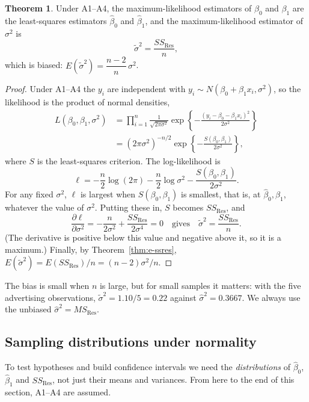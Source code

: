 \documentclass[11pt,a4paper]{article}
\numberwithin{equation}{section}
\theoremstyle{definition}
\newtheorem{thm}{Theorem}[subsection]
\begin{document}
\begin{thm}\label{thm:mle}
Under A1--A4, the maximum-likelihood estimators of $\beta_0$ and $\beta_1$ are the
least-squares estimators $\hat\beta_0$ and $\hat\beta_1$, and the maximum-likelihood
estimator of $\sigma^2$ is
\[
\tilde\sigma^2 = \frac{SS_{\mathrm{Res}}}{n} ,
\]
which is biased: $E(\tilde\sigma^2) = \dfrac{n-2}{n}\,\sigma^2$.
\end{thm}

\begin{proof}
Under A1--A4 the $y_i$ are independent with $y_i \sim N(\beta_0 + \beta_1 x_i, \sigma^2)$, so
the likelihood is the product of normal densities,
\begin{align*}
L(\beta_0, \beta_1, \sigma^2)
&= \prod_{i=1}^n \frac{1}{\sqrt{2\pi\sigma^2}} \exp\left\{ -\frac{(y_i - \beta_0 - \beta_1 x_i)^2}{2\sigma^2} \right\} \\
&= (2\pi\sigma^2)^{-n/2} \exp\left\{ -\frac{S(\beta_0, \beta_1)}{2\sigma^2} \right\},
\end{align*}
where $S$ is the least-squares criterion. The log-likelihood is
\[
\ell = -\frac n2 \log(2\pi) - \frac n2 \log \sigma^2 - \frac{S(\beta_0, \beta_1)}{2\sigma^2} .
\]
For any fixed $\sigma^2$, $\ell$ is largest when $S(\beta_0, \beta_1)$ is smallest, that is,
at $\hat\beta_0, \hat\beta_1$, whatever the value of $\sigma^2$. Putting these in, $S$ becomes
$SS_{\mathrm{Res}}$, and
\[
\frac{\partial \ell}{\partial \sigma^2} = -\frac{n}{2\sigma^2} + \frac{SS_{\mathrm{Res}}}{2\sigma^4} = 0
\quad\text{gives}\quad \tilde\sigma^2 = \frac{SS_{\mathrm{Res}}}{n} .
\]
(The derivative is positive below this value and negative above it, so it is a maximum.)
Finally, by Theorem~\ref{thm:e-ssres},
$E(\tilde\sigma^2) = E(SS_{\mathrm{Res}})/n = (n-2)\sigma^2/n$.
\end{proof}

The bias is small when $n$ is large, but for small samples it matters: with the five
advertising observations, $\tilde\sigma^2 = 1.10/5 = 0.22$ against
$\hat\sigma^2 = 0.3667$. We always use the unbiased $\hat\sigma^2 = MS_{\mathrm{Res}}$.

\subsection{Sampling distributions under normality}\label{ssec:distributions}
To test hypotheses and build confidence intervals we need the \emph{distributions} of
$\hat\beta_0$, $\hat\beta_1$ and $SS_{\mathrm{Res}}$, not just their means and variances.
From here to the end of this section, A1--A4 are assumed.
\end{document}
